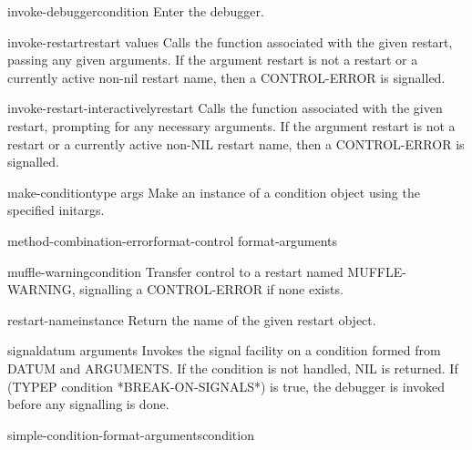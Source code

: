 \documentclass[10pt,english]{book}
\begin{document}
\begin{function}{invoke-debugger}{condition}
  Enter the debugger.
\end{function}

\begin{function}{invoke-restart}{restart \rest values}
  Calls the function associated with the given restart, passing any given
   arguments. If the argument restart is not a restart or a currently active
   non-nil restart name, then a CONTROL-ERROR is signalled.
\end{function}

\begin{function}{invoke-restart-interactively}{restart}
  Calls the function associated with the given restart, prompting for any
   necessary arguments. If the argument restart is not a restart or a
   currently active non-NIL restart name, then a CONTROL-ERROR is signalled.
\end{function}

\begin{function}{make-condition}{type \rest args}
  Make an instance of a condition object using the specified initargs.
\end{function}

\begin{function}{method-combination-error}{format-control \rest format-arguments}
  
\end{function}

\begin{function}{muffle-warning}{\op condition}
  Transfer control to a restart named MUFFLE-WARNING, signalling a
   CONTROL-ERROR if none exists.
\end{function}

\begin{function}{restart-name}{instance}
  Return the name of the given restart object.
\end{function}

\begin{function}{signal}{datum \rest arguments}
  Invokes the signal facility on a condition formed from DATUM and
   ARGUMENTS. If the condition is not handled, NIL is returned. If
   (TYPEP condition *BREAK-ON-SIGNALS*) is true, the debugger is invoked
   before any signalling is done.
\end{function}

\begin{function}{simple-condition-format-arguments}{condition}
  
\end{function}
\end{document}
